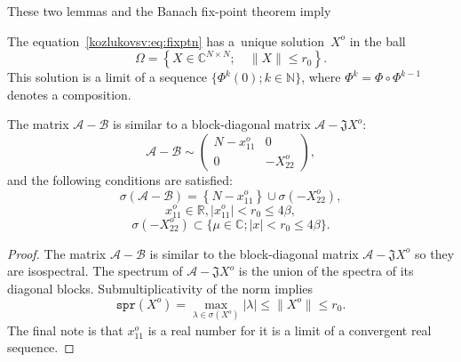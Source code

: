 These two lemmas and the Banach fix-point theorem imply
\begin{lem}
    The equation~\eqref{kozlukovsv:eq:fixptn} has a~unique solution~\( X^o \)
    in the ball
    \[
        \Omega = \left\{ X\in\mathbb{C}^{N{\times}N}; \quad \|X\| \leq r_0 \right\}.
        \]
    This solution is a limit of a sequence \( \{ \Phi^k(0); k\in\mathbb{N} \} \),
    where \( \Phi^k = \Phi\circ\Phi^{k-1} \) denotes a composition.
\end{lem}

\begin{crl}
The matrix \( \mathcal{A}{-}\mathcal{B} \) is similar
    to a block-diagonal matrix \( \mathcal{A}{-}\mathfrak{J} X^o \):
\[
    \mathcal{A} - \mathcal{B} \sim
    \begin{pmatrix}
    N - x_{11}^o & 0 \\
    0 & -X_{22}^o
    \end{pmatrix},
    \]
and the following conditions are satisfied:
\[
    \sigma\left(\mathcal{A} - \mathcal{B}\right) = \left\{N-x_{11}^o\right\}\cup \sigma\left(-X_{22}^o\right),
    \]
\[
    x_{11}^o\in\mathbb{R}, \lvert x_{11}^o \rvert < r_0 \leq 4\beta,
    \]
\[
    \sigma\left(-X_{22}^o\right) \subset \{ \mu\in\mathbb{C}; \lvert x \rvert < r_0 \leq 4\beta \}.
    \]
\end{crl}
\begin{proof}
    The matrix \( \mathcal{A} - \mathcal{B} \) is similar to the block-diagonal matrix \( \mathcal{A} - \mathfrak{J} X^o \)
        so they are isospectral.
    The spectrum of \( \mathcal{A} - \mathfrak{J} X^o \)
        is the union of the spectra of its diagonal blocks.
    Submultiplicativity of the norm implies
    \[
        \mathtt{spr}(X^o) = \max_{\lambda\in\sigma(X^o)}\lvert\lambda\rvert \leq \|X^o\| \leq r_0.
        \]
    The final note is that \( x_{11}^o \) is a real number for it is a limit of a convergent real sequence.
\end{proof}

